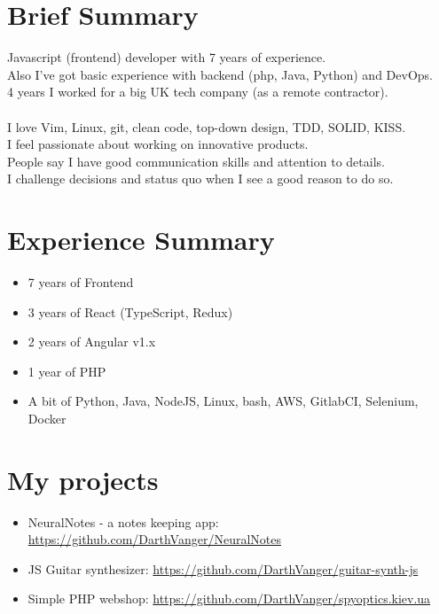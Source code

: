 \documentclass[a4paper, 14pt]{article}
\begin{document}
\begin{center}
	\textsc{\Huge{}}
\end{center}


\section{Brief Summary}
  Javascript (frontend) developer with 7 years of experience.  \\
  Also I've got basic experience with backend (php, Java, Python) and DevOps.  \\
  4 years I worked for a big UK tech company (as a remote contractor). \\
  \\
  I love Vim, Linux, git, clean code, top-down design, TDD, SOLID, KISS. \\
  I feel passionate about working on innovative products. \\
  People say I have good communication skills and attention to details. \\
  I challenge decisions and status quo when I see a good reason to do so.

\section{Experience Summary}
  \begin{itemize}
    \item 7 years of Frontend  \\
    \item 3 years of React (TypeScript, Redux) \\
    \item 2 years of Angular v1.x \\ 
    \item 1 year of PHP \\
    \item A bit of Python, Java, NodeJS, Linux, bash, AWS, GitlabCI, Selenium, Docker
  \end{itemize}

\section{My projects}
  \begin{itemize}
    \item NeuralNotes - a notes keeping app: \url{https://github.com/DarthVanger/NeuralNotes} \\
    \item JS Guitar synthesizer: \url{https://github.com/DarthVanger/guitar-synth-js} \\
    \item Simple PHP webshop: \url{https://github.com/DarthVanger/spyoptics.kiev.ua}
  \end{itemize}
\end{document}
